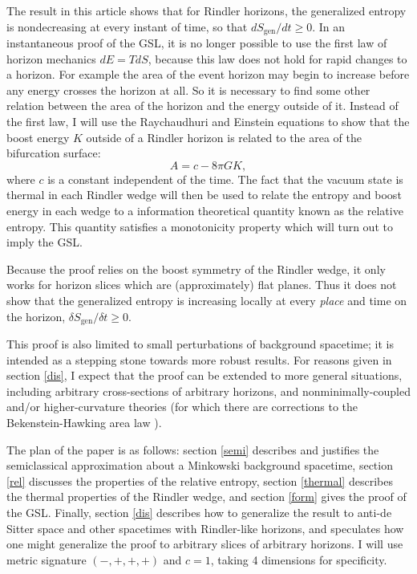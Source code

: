 \documentclass{article}
\begin{document}
The result in this article shows that for Rindler horizons, the generalized entropy is nondecreasing at every instant of time, so that $d S_\mathrm{gen} / dt \ge 0$.  In an instantaneous proof of the GSL, it is no longer possible to use the first law of horizon mechanics $dE = T dS$, because this law does not hold for rapid changes to a horizon.  For example the area of the event horizon may begin to increase before any energy crosses the horizon at all.  So it is necessary to find some other relation between the area of the horizon and the energy outside of it.  Instead of the first law, I will use the Raychaudhuri and Einstein equations to show that the boost energy $K$ outside of a Rindler horizon is related to the area of the bifurcation surface:
\begin{equation}\label{AK}
A = c - 8\pi G K,
\end{equation}
where $c$ is a constant independent of the time.  The fact that the vacuum state is thermal in each Rindler wedge will then be used to relate the entropy and boost energy in each wedge to a information theoretical quantity known as the relative entropy.  This quantity satisfies a monotonicity property which will turn out to imply the GSL.

Because the proof relies on the boost symmetry of the Rindler wedge, it only works for horizon slices which are (approximately) flat planes.  Thus it does not show that the generalized entropy is increasing locally at every \emph{place} and time on the horizon, $\delta S_\mathrm{gen} / \delta t \ge 0$.

This proof is also limited to small perturbations of background spacetime; it is intended as a stepping stone towards more robust results.  For reasons given in section \ref{dis}, I expect that the proof can be extended to more general situations, including arbitrary cross-sections of arbitrary horizons, and nonminimally-coupled and/or higher-curvature theories (for which there are corrections to the Bekenstein-Hawking area law \cite{WI94}).

The plan of the paper is as follows: section \ref{semi} describes and justifies the semiclassical approximation about a Minkowski background spacetime, section \ref{rel} discusses the properties of the relative entropy, section \ref{thermal} describes the thermal properties of the Rindler wedge, and section \ref{form} gives the proof of the GSL.  Finally, section \ref{dis} describes how to generalize the result to anti-de Sitter space and other spacetimes with Rindler-like horizons, and speculates how one might generalize the proof to arbitrary slices of arbitrary horizons.  I will use metric signature $(-,+,+,+)$ and $c = 1$, taking 4 dimensions for specificity.
\end{document}
